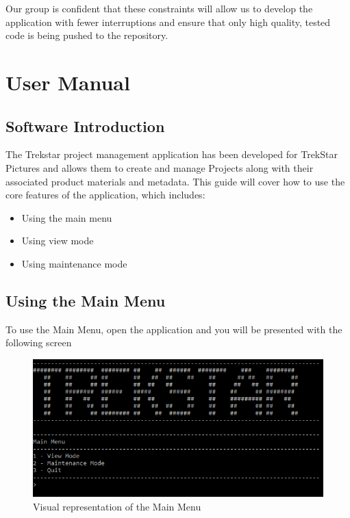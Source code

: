 \documentclass[
  english,
  a4paper,
,tablecaptionabove
]{scrartcl}
\providecommand{\tightlist}{%
  \setlength{\itemsep}{0pt}\setlength{\parskip}{0pt}}
\begin{document}
Our group is confident that these constraints will allow us to develop
the application with fewer interruptions and ensure that only high
quality, tested code is being pushed to the repository.

\newpage

\hypertarget{user-manual}{%
\section{User Manual}\label{user-manual}}

\hypertarget{software-introduction}{%
\subsection{Software Introduction}\label{software-introduction}}

The Trekstar project management application has been developed for
TrekStar Pictures and allows them to create and manage Projects along
with their associated product materials and metadata. This guide will
cover how to use the core features of the application, which includes:

\begin{itemize}
\tightlist
\item
  Using the main menu
\item
  Using view mode
\item
  Using maintenance mode
\end{itemize}

\hypertarget{using-the-main-menu}{%
\subsection{Using the Main Menu}\label{using-the-main-menu}}

To use the Main Menu, open the application and you will be presented
with the following screen

\begin{figure}
\centering
\includegraphics{images/user-guide/main-menu/using-the-main-menu.png}
\caption{Visual representation of the Main Menu}
\end{figure}
\end{document}
